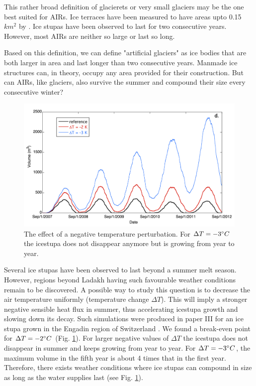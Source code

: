 This rather broad definition of glacierets or very small glaciers may be the one best suited for AIRs. Ice
terraces have been measured to have areas upto 0.15 $km^2$ by
\citet{nusserSociohydrologyArtificialGlaciers2019}. Ice stupas have been observed to last for two consecutive
years. However, most AIRs are neither so large or last so long.

Based on this definition, we can define "artificial glaciers" as ice bodies that are both larger in area and
last longer than two consecutive years. Manmade ice structures can, in theory, occupy any area provided for
their construction. But can AIRs, like glaciers, also survive the summer and compound their size every
consecutive winter? 

\begin{figure}[htb]
  \centering
	\includegraphics[width=12 cm]{figs/PIR_example.png}
  \caption{The effect of a negative temperature perturbation. For $\Delta T = -3 ^{\circ} C$ the icestupa does
  not disappear anymore but is growing from year to year.}
\label{fig:PIR}
\end{figure}

Several ice stupas have been observed to last beyond a summer melt season. However, regions beyond Ladakh having
such favourable weather conditions remain to be discovered. A possible way to study this question is to decrease
the air temperature uniformly (temperature change $\Delta T$). This will imply a stronger negative sensible heat
flux in summer, thus accelerating icestupa growth and slowing down its decay. Such simulations were produced in
paper III for an ice stupa grown in the Engadin region of Switzerland .  We found a break-even point for $\Delta
T = -2 ^{\circ} C$ (Fig. \ref{fig:PIR}). For larger negative values of $\Delta T$ the icestupa does not disappear
in summer and keeps growing from year to year. For $\Delta T = -3 ^{\circ} C$, the maximum volume in the fifth
year is about 4 times that in the first year. Therefore, there exists weather conditions where ice stupas can
compound in size as long as the water supplies last (see Fig. \ref{fig:PIR}).

